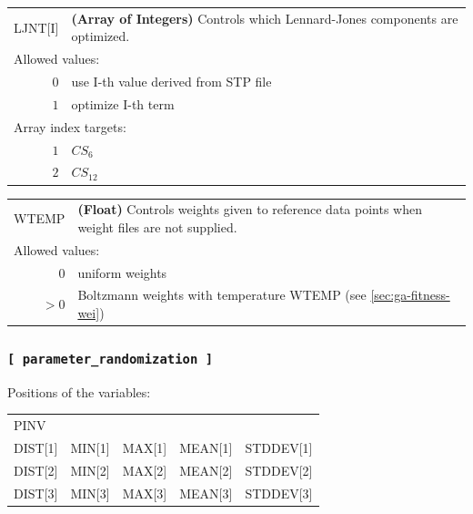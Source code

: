 \documentclass[10pt,a4paper,openany]{memoir}
\numberwithin{equation}{section}
\begin{document}
{
\begin{tabular}{r@{ : }l}
\label{descr:ljnt}
      LJNT[I]&\textbf{(Array of Integers)} Controls which Lennard-Jones components are optimized.                                               \\ 
\multicolumn{2}{l}{Allowed values:} \\ 
     \(0\)&use I-th value derived from STP file                                                                         \\ 
     \(1\)&optimize I-th term                                                                                   \\ 
\multicolumn{2}{l}{Array index targets:} \\ 
     \(1\)&$CS_6$                                                                                 \\ 
     \(2\)&$CS_{12}$                                                                            \\ 
\end{tabular}
\vspace{1ex}
}

{
\begin{tabular}{r@{ : }l}
\label{descr:wtemp}
     WTEMP&\textbf{(Float)} Controls weights given to reference data points when weight files are not supplied. \\ 
\multicolumn{2}{l}{Allowed values:} \\ 
     \(0\)&uniform weights                                                                                      \\ 
    \(>0\)&Boltzmann weights with temperature WTEMP (see \autoref{sec:ga-fitness-wei})                                                            \\ 
\end{tabular}
\vspace{1ex}
}

\subsubsection{\texttt{[~parameter\_randomization~]}}
\label{sec:inp-parameter_randomization}

Positions of the variables:
\begin{center}
  \begin{tabular}{lllll}
    PINV&&&& \\
    DIST[1]&MIN[1]&MAX[1]&MEAN[1]&STDDEV[1] \\
    DIST[2]&MIN[2]&MAX[2]&MEAN[2]&STDDEV[2] \\
    DIST[3]&MIN[3]&MAX[3]&MEAN[3]&STDDEV[3] \\
  \end{tabular}
\end{center}
\end{document}
